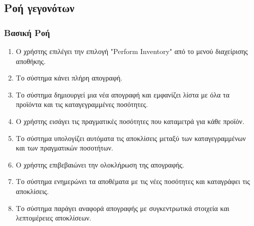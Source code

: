 \documentclass[12pt,a4paper,twoside]{book}
\begin{document}
\subsection{Ροή γεγονότων}

\subsubsection{Βασική Ροή}
\begin{enumerate}
  \item Ο χρήστης επιλέγει την επιλογή "Perform Inventory" από το μενού διαχείρισης αποθήκης. %
  \item Το σύστημα κάνει πλήρη απογραφή.
  \item Το σύστημα δημιουργεί μια νέα απογραφή και εμφανίζει λίστα με όλα τα προϊόντα και τις καταγεγραμμένες ποσότητες. %
  \item Ο χρήστης εισάγει τις πραγματικές ποσότητες που καταμετρά για κάθε προϊόν.
  \item Το σύστημα υπολογίζει αυτόματα τις αποκλίσεις μεταξύ των καταγεγραμμένων και των πραγματικών ποσοτήτων.
  \item Ο χρήστης επιβεβαιώνει την ολοκλήρωση της απογραφής.
  \item Το σύστημα ενημερώνει τα αποθέματα με τις νέες ποσότητες και καταγράφει τις αποκλίσεις.
  \item Το σύστημα παράγει αναφορά απογραφής με συγκεντρωτικά στοιχεία και λεπτομέρειες αποκλίσεων.
\end{enumerate}
\end{document}
